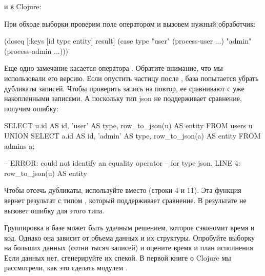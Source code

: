 \noindent
и в Clojure:

\begin{english}
  \begin{clojure}
  \end{clojure}
\end{english}

При обходе выборки проверим поле  оператором  и вызовем нужный обработчик:

\begin{english}
  \begin{clojure}
(doseq [{:keys [id type entity]} result]
  (case type
    "user" (process-user ...)
    "admin" (process-admin ...)))
  \end{clojure}
\end{english}

Еще одно замечание касается оператора . Обратите внимание, что мы использовали его  версию. Если опустить частицу  после , база попытается убрать дубликаты записей. Чтобы проверить запись на повтор, ее сравнивают с уже накопленными записями. А поскольку тип json не поддерживает сравнение, получим ошибку:

\begin{english}
  \begin{sql/lines}
SELECT
  u.id AS id,
  'user' AS type,
  row_to_json(u) AS entity
FROM
  users u
UNION
SELECT
  a.id AS id,
  'admin' AS type,
  row_to_json(a) AS entity
FROM
  admins a;

-- ERROR: could not identify an equality operator
-- for type json. LINE 4: row_to_json(u) AS entity
  \end{sql/lines}
\end{english}

Чтобы отсечь дубликаты, используйте  вместо  (строки 4 и 11). Эта функция вернет результат с типом , который поддерживает сравнение. В результате  не вызовет ошибку для этого типа.

Группировка в базе может быть удачным решением, которое сэкономит время и код. Однако она зависит от объема данных и их структуры. Опробуйте выборку на больших данных (сотни тысяч записей) и оцените время и план исполнения. Если данных нет, сгенерируйте их спекой. В первой книге о Clojure мы рассмотрели, как это сделать модулем .

